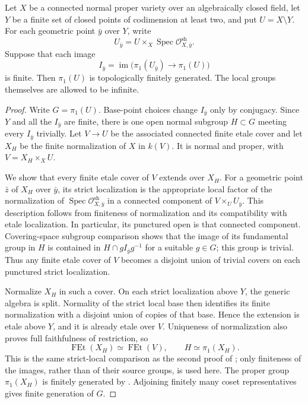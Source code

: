 \begin{proposition}
\label{D:finite-local-images}
Let $X$ be a connected normal proper variety over an algebraically
closed field, let $Y$ be a finite set of closed points of codimension
at least two, and put $U=X\setminus Y$.  For each geometric point
$\bar y$ over $Y$, write
\[
 U_{\bar y}=U\times_X
          \operatorname{Spec}\mathcal O^{\mathrm{sh}}_{X,\bar y}.
\]
Suppose that each image
\[
 I_{\bar y}=\operatorname{im}
       \bigl(\pi_1(U_{\bar y})\longrightarrow\pi_1(U)\bigr)
\]
is finite.  Then $\pi_1(U)$ is topologically finitely generated.
The local groups themselves are allowed to be infinite.
\end{proposition}
\begin{proof}
Write $G=\pi_1(U)$.  Base-point choices change $I_{\bar y}$ only
by conjugacy.  Since $Y$ and all the $I_{\bar y}$ are finite, there
is one open normal subgroup $H\subset G$ meeting every
$I_{\bar y}$ trivially.  Let $V\to U$ be the associated connected
finite etale cover and let $X_H$ be the finite normalization of $X$
in $k(V)$.  It is normal and proper, with $V=X_H\times_XU$.

We show that every finite etale cover of $V$ extends over $X_H$.
For a geometric point $\bar z$ of $X_H$ over $\bar y$, its strict
localization is the appropriate local factor of the normalization
of $\operatorname{Spec}\mathcal O^{\mathrm{sh}}_{X,\bar y}$ in a
connected component of $V\times_UU_{\bar y}$.  This description
follows from finiteness of normalization and its compatibility
with etale localization.  In particular, its punctured open is
that connected component.  Covering-space subgroup comparison
shows that the image of its fundamental group in $H$ is contained
in $H\cap gI_{\bar y}g^{-1}$ for a suitable $g\in G$; this group
is trivial.  Thus any finite etale cover of $V$ becomes a disjoint
union of trivial covers on each punctured strict localization.

Normalize $X_H$ in such a cover.  On each strict localization
above $Y$, the generic algebra is split.  Normality of the strict
local base then identifies its finite normalization with a
disjoint union of copies of that base.  Hence the extension is
etale above $Y$, and it is already etale over $V$.  Uniqueness of
normalization also proves full faithfulness of restriction, so
\[
 \operatorname{FEt}(X_H)\simeq\operatorname{FEt}(V),
 \qquad H\simeq\pi_1(X_H).
\]
This is the same strict-local comparison as the second proof of
\cite[Corollary 4.2, arXiv pp.~7--8]{BCGST2019D}; only finiteness
of the images, rather than of their source groups, is used here.
The proper group $\pi_1(X_H)$ is finitely generated by
\cite[X, Theorem 2.9]{SGA1}.  Adjoining finitely many coset
representatives gives finite generation of $G$.
\end{proof}

